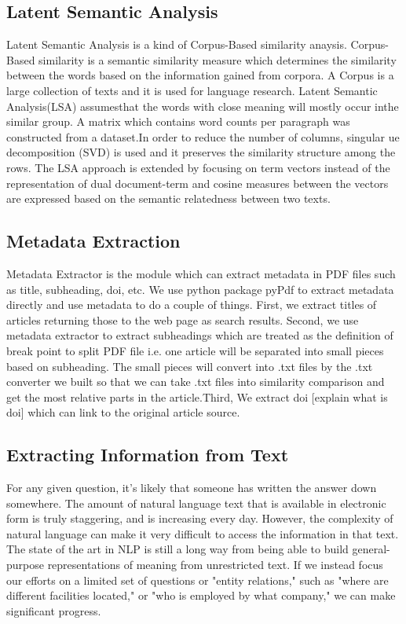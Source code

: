 \subsection{Latent Semantic Analysis}
Latent Semantic Analysis is a kind of Corpus-Based similarity anaysis. Corpus-Based similarity is a semantic similarity measure which determines the similarity between the words based on the information gained from corpora. A Corpus is a large collection of texts and it is used for language research. Latent Semantic Analysis(LSA) assumesthat the words with close meaning will mostly occur inthe similar group. A matrix which contains word counts per paragraph was constructed from a  dataset.In order to reduce the number of columns, singular ue decomposition (SVD) is used and it preserves the similarity structure among the rows. The LSA approach is extended by focusing on term vectors instead of the representation of dual document-term and cosine measures between the vectors are expressed based on the semantic relatedness between two texts.
 
\subsection{Metadata Extraction}
Metadata Extractor is the module which can extract metadata in PDF files such as title, subheading, doi, etc. We use python package pyPdf to extract metadata directly and use metadata to do a couple of things. First, we extract titles of articles returning those to the web page as search results. Second, we use metadata extractor to extract subheadings which are treated as the definition of break point to split PDF file i.e. one article will be separated into small pieces based on subheading. The small pieces will convert into .txt files by the .txt converter we built so that we can take .txt files into similarity comparison and get the most relative parts in the article.Third, We extract doi [explain what is doi] which can link to the original article source. 
      \subsection{Extracting Information from Text}
For any given question, it's likely that someone has written the answer down somewhere. The amount of natural language text that is available in electronic form is truly staggering, and is increasing every day. 
However, the complexity of natural language can make it very difficult to access the information in that text. The state of the art in NLP is still a long way from being able to build general-purpose representations of meaning from unrestricted text. 
If we instead focus our efforts on a limited set of questions or "entity relations," such as "where are different facilities located," or "who is employed by what company," we can make significant progress.
